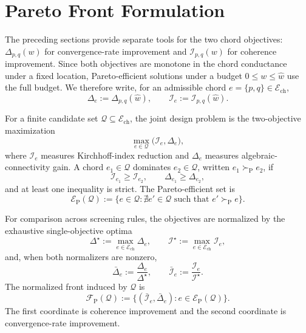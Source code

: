 \documentclass[11pt]{article}
\numberwithin{equation}{section}
\theoremstyle{definition}
\theoremstyle{remark}
\begin{document}
\section{Pareto Front Formulation}
\label{sec:pareto}

The preceding sections provide separate tools for the two chord objectives:
$\Delta_{p,q}(w)$ for convergence-rate improvement and
$\mathcal I_{p,q}(w)$ for coherence improvement. Since both objectives are
monotone in the chord conductance under a fixed location, Pareto-efficient
solutions under a budget $0\le w\le\hat w$ use the full budget. We therefore
write, for an admissible chord $e=\{p,q\}\in\mathcal E_{\mathrm{ch}}$,
\begin{equation}\label{eq:pareto_raw_objectives}
	\Delta_e:=\Delta_{p,q}(\hat w),
	\qquad
	\mathcal I_e:=\mathcal I_{p,q}(\hat w).
\end{equation}

For a finite candidate set $\mathcal Q\subseteq\mathcal E_{\mathrm{ch}}$, the
joint design problem is the two-objective maximization
\begin{equation}\label{eq:finite_pareto_problem}
	\max_{e\in\mathcal Q}\bigl(\mathcal I_e,\Delta_e\bigr),
\end{equation}
where $\mathcal I_e$ measures Kirchhoff-index reduction and $\Delta_e$
measures algebraic-connectivity gain. A chord $e_1\in\mathcal Q$ dominates
$e_2\in\mathcal Q$, written $e_1\succ_{\mathrm P}e_2$, if
\[
\mathcal I_{e_1}\ge \mathcal I_{e_2},
\qquad
\Delta_{e_1}\ge \Delta_{e_2},
\]
and at least one inequality is strict. The Pareto-efficient set is
\begin{equation}\label{eq:pareto_efficient_set}
	\mathcal E_{\mathrm P}(\mathcal Q)
	:=
	\{e\in\mathcal Q:\nexists e'\in\mathcal Q
	\text{ such that }e'\succ_{\mathrm P}e\}.
\end{equation}

For comparison across screening rules, the objectives are normalized by the
exhaustive single-objective optima
\begin{equation}\label{eq:global_pareto_normalizers}
	\Delta^\star:=\max_{e\in\mathcal E_{\mathrm{ch}}}\Delta_e,
	\qquad
	\mathcal I^\star:=\max_{e\in\mathcal E_{\mathrm{ch}}}\mathcal I_e,
\end{equation}
and, when both normalizers are nonzero,
\begin{equation}\label{eq:normalized_pareto_objectives}
	\bar\Delta_e:=\frac{\Delta_e}{\Delta^\star},
	\qquad
	\bar{\mathcal I}_e:=\frac{\mathcal I_e}{\mathcal I^\star}.
\end{equation}
The normalized front induced by $\mathcal Q$ is
\begin{equation}\label{eq:pareto_front_image}
	\mathcal F_{\mathrm P}(\mathcal Q)
	:=
	\{(\bar{\mathcal I}_e,\bar\Delta_e):
	e\in\mathcal E_{\mathrm P}(\mathcal Q)\}.
\end{equation}
The first coordinate is coherence improvement and the second coordinate is
convergence-rate improvement.
\end{document}
